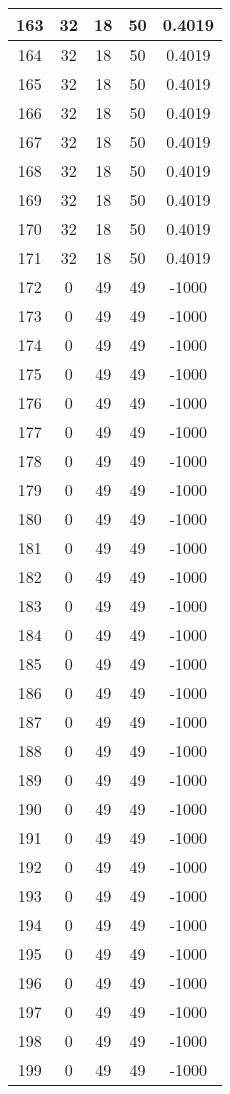 \documentclass[letterpaper, 12pt]{article}
\begin{document}
\begin{longtable}{|c|c|c|c|c|}
\hline
163 & 32 & 18 & 50 & 0.4019 \\
\hline
164 & 32 & 18 & 50 & 0.4019 \\
\hline
165 & 32 & 18 & 50 & 0.4019 \\
\hline
166 & 32 & 18 & 50 & 0.4019 \\
\hline
167 & 32 & 18 & 50 & 0.4019 \\
\hline
168 & 32 & 18 & 50 & 0.4019 \\
\hline
169 & 32 & 18 & 50 & 0.4019 \\
\hline
170 & 32 & 18 & 50 & 0.4019 \\
\hline
171 & 32 & 18 & 50 & 0.4019 \\
\hline
172 & 0 & 49 & 49 & -1000 \\
\hline
173 & 0 & 49 & 49 & -1000 \\
\hline
174 & 0 & 49 & 49 & -1000 \\
\hline
175 & 0 & 49 & 49 & -1000 \\
\hline
176 & 0 & 49 & 49 & -1000 \\
\hline
177 & 0 & 49 & 49 & -1000 \\
\hline
178 & 0 & 49 & 49 & -1000 \\
\hline
179 & 0 & 49 & 49 & -1000 \\
\hline
180 & 0 & 49 & 49 & -1000 \\
\hline
181 & 0 & 49 & 49 & -1000 \\
\hline
182 & 0 & 49 & 49 & -1000 \\
\hline
183 & 0 & 49 & 49 & -1000 \\
\hline
184 & 0 & 49 & 49 & -1000 \\
\hline
185 & 0 & 49 & 49 & -1000 \\
\hline
186 & 0 & 49 & 49 & -1000 \\
\hline
187 & 0 & 49 & 49 & -1000 \\
\hline
188 & 0 & 49 & 49 & -1000 \\
\hline
189 & 0 & 49 & 49 & -1000 \\
\hline
190 & 0 & 49 & 49 & -1000 \\
\hline
191 & 0 & 49 & 49 & -1000 \\
\hline
192 & 0 & 49 & 49 & -1000 \\
\hline
193 & 0 & 49 & 49 & -1000 \\
\hline
194 & 0 & 49 & 49 & -1000 \\
\hline
195 & 0 & 49 & 49 & -1000 \\
\hline
196 & 0 & 49 & 49 & -1000 \\
\hline
197 & 0 & 49 & 49 & -1000 \\
\hline
198 & 0 & 49 & 49 & -1000 \\
\hline
199 & 0 & 49 & 49 & -1000 \\
\hline
\end{longtable}
\end{document}
